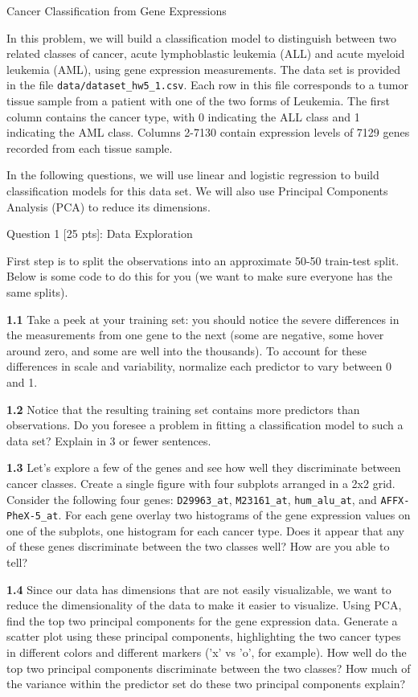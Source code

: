 \documentclass[11pt]{article}
\begin{document}
    Cancer Classification from Gene Expressions

In this problem, we will build a classification model to distinguish
between two related classes of cancer, acute lymphoblastic leukemia
(ALL) and acute myeloid leukemia (AML), using gene expression
measurements. The data set is provided in the file
\texttt{data/dataset\_hw5\_1.csv}. Each row in this file corresponds to
a tumor tissue sample from a patient with one of the two forms of
Leukemia. The first column contains the cancer type, with 0 indicating
the ALL class and 1 indicating the AML class. Columns 2-7130 contain
expression levels of 7129 genes recorded from each tissue sample.

In the following questions, we will use linear and logistic regression
to build classification models for this data set. We will also use
Principal Components Analysis (PCA) to reduce its dimensions.

     Question 1 {[}25 pts{]}: Data Exploration

First step is to split the observations into an approximate 50-50
train-test split. Below is some code to do this for you (we want to make
sure everyone has the same splits).

\textbf{1.1} Take a peek at your training set: you should notice the
severe differences in the measurements from one gene to the next (some
are negative, some hover around zero, and some are well into the
thousands). To account for these differences in scale and variability,
normalize each predictor to vary between 0 and 1.

\textbf{1.2} Notice that the resulting training set contains more
predictors than observations. Do you foresee a problem in fitting a
classification model to such a data set? Explain in 3 or fewer
sentences.

\textbf{1.3} Let's explore a few of the genes and see how well they
discriminate between cancer classes. Create a single figure with four
subplots arranged in a 2x2 grid. Consider the following four genes:
\texttt{D29963\_at}, \texttt{M23161\_at}, \texttt{hum\_alu\_at}, and
\texttt{AFFX-PheX-5\_at}. For each gene overlay two histograms of the
gene expression values on one of the subplots, one histogram for each
cancer type. Does it appear that any of these genes discriminate between
the two classes well? How are you able to tell?

\textbf{1.4} Since our data has dimensions that are not easily
visualizable, we want to reduce the dimensionality of the data to make
it easier to visualize. Using PCA, find the top two principal components
for the gene expression data. Generate a scatter plot using these
principal components, highlighting the two cancer types in different
colors and different markers ('x' vs 'o', for example). How well do the
top two principal components discriminate between the two classes? How
much of the variance within the predictor set do these two principal
components explain?
\end{document}

